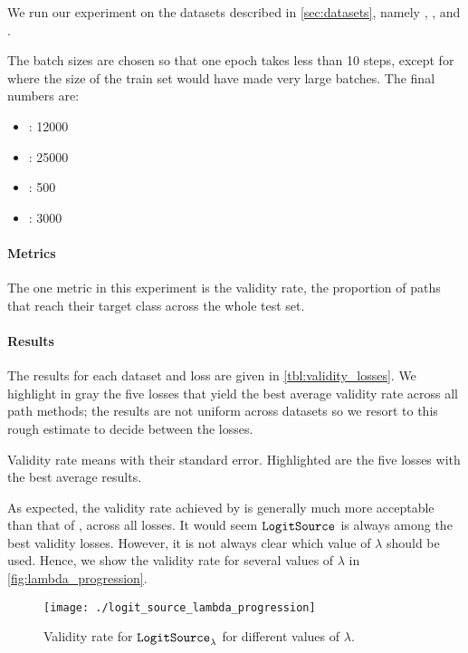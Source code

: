 \documentclass[../main.tex]{subfiles}
\begin{document}
We run our experiment on the datasets described in \autoref{sec:datasets}, namely \CakeOnSea, \ForestCover, \WineQuality{} and \OnlineNewsPopularity.

The batch sizes are chosen so that one epoch takes less than 10 steps, except for \ForestCover{} where the size of the train set would have made very large batches.
The final numbers are:
\begin{itemize}
    \item \CakeOnSea: 12000
    \item \ForestCover: 25000
    \item \WineQuality: 500
    \item \OnlineNewsPopularity: 3000
\end{itemize}

\paragraph{Metrics}

The one metric in this experiment is the validity rate, \ie{} the proportion of paths that reach their target class across the whole test set.

\paragraph{Results}

The results for each dataset and loss are given in \autoref{tbl:validity_losses}.
We highlight in gray the five losses that yield the best average validity rate across all path methods; the results are not uniform across datasets so we resort to this rough estimate to decide between the losses.

\begin{table}[h!]
\centering

\caption{Validity rate means with their standard error. Highlighted are the five losses with the best average results.}
\label{tbl:validity_losses}
\end{table}

As expected, the validity rate achieved by \revise{} is generally much more acceptable than that of \ls{}, across all losses.
It would seem $\mathtt{LogitSource}_{}$ is always among the best validity losses. However, it is not always clear which value of $\lambda$ should be used.
Hence, we show the validity rate for several values of $\lambda$ in \autoref{fig:lambda_progression}.

\begin{figure}[htbp]
    \centering
    \texttt{[image: ./logit\_source\_lambda\_progression]}

    \caption{Validity rate for $\mathtt{LogitSource}_{\lambda}$ for different values of $\lambda$.}
    \label{fig:lambda_progression}
\end{figure}
\end{document}
